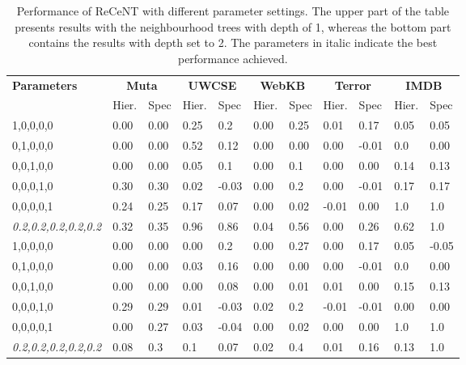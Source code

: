 \begin{table*}[t]
\begin{center}
\footnotesize

\caption{Performance of ReCeNT with different parameter settings. The upper part of the table presents results with the neighbourhood trees with depth of 1, whereas the bottom part contains the results with depth set to 2. The parameters in italic indicate the best performance achieved.}

\begin{tabular}[t]{|p{2cm}|p{0.5cm}|p{0.5cm}|p{0.5cm}|p{0.6cm}|p{0.5cm}|p{0.5cm}|p{0.6cm}|p{0.6cm}|p{0.5cm}|p{0.6cm}|}
	\hline
	\multirow{2}{*}{\textbf{Parameters}} & \multicolumn{2}{|c|}{\textbf{Muta}} & \multicolumn{2}{|c|}{\textbf{UWCSE}} & \multicolumn{2}{|c|}{\textbf{WebKB}} & \multicolumn{2}{|c|}{\textbf{Terror}}  & \multicolumn{2}{|c|}{\textbf{IMDB}} \\
	                     &  Hier. & Spec    & Hier. & Spec & Hier.  & Spec  & Hier.  & Spec   & Hier.  & Spec   \\
	\hline
	1,0,0,0,0   &  0.00	   &   0.00		 		& 0.25 & 0.2     		& 0.00  & 0.25       & 0.01 & 0.17 		& 0.05 & 0.05   \\
	\hline
	0,1,0,0,0 &  	0.00  &  0.00     	 		& 0.52 & 0.12   		& 0.00  & 0.00     	  & 0.00 & -0.01		& 0.0 & 0.00  \\
	\hline
	0,0,1,0,0  &  	0.00  &  0.00	      		& 0.05 & 0.1  	  		& 0.00 & 0.1         & 0.00 & 0.00  		& 0.14 & 0.13  \\
	\hline
	0,0,0,1,0  & 0.30  &  0.30    				& 0.02 & -0.03 	   		& 0.00 & 0.2         & 0.00 & -0.01 		& 0.17 & 0.17  \\
	\hline
	0,0,0,0,1  &    0.24  & 0.25				& 0.17 &  0.07     		& 0.00 & 0.02  		  & -0.01 & 0.00  		& 1.0 &   1.0   \\
	\hline
	\textit{0.2,0.2,0.2,0.2,0.2} & 0.32 & 0.35 &0.96 &  0.86   		& 0.04 & 0.56 		  & 0.00 & 0.26 		& 0.62 & 1.0  \\
	\hline
	\hline
	1,0,0,0,0  &  	0.00   & 0.00	 			& 0.00 & 0.2   			& 0.00 & 0.27 		  & 0.00 & 0.17  		& 0.05 & -0.05   \\
	\hline
	0,1,0,0,0 &  	0.00  & 0.00	 			& 0.03 & 0.16 			& 0.00	& 0.00 		  & 0.00 & -0.01 		& 0.0 & 0.00  \\
	\hline
	0,0,1,0,0  &  	0.00 &  0.00  				& 0.00 & 0.08  	  		& 0.00 & 0.01      	  & 0.01 & 0.00 		& 0.15 & 0.13  \\
	\hline
	0,0,0,1,0  &  	0.29 &  0.29   				& 0.01 & -0.03			& 0.02  & 0.2 	  	  & -0.01 & -0.01		& 0.00 & 0.00  \\
	\hline
	0,0,0,0,1  &   0.00 & 0.27     			    & 0.03 	& -0.04			& 0.00 & 0.02  		  & 0.00 &  0.00		& 1.0 &  1.0    \\
	\hline
	\textit{0.2,0.2,0.2,0.2,0.2} & 0.08 & 0.3  & 0.1	&  0.07  	    &  0.02&  0.4 		  & 0.01 & 0.16 		& 0.13 & 1.0 \\
	\hline


\end{tabular}
\end{center}
\end{table*}
